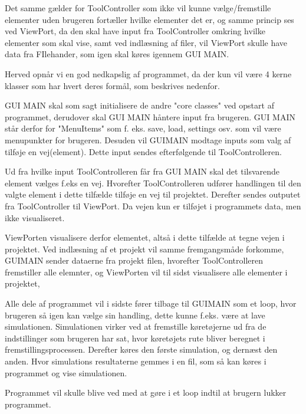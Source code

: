 Det samme gælder for ToolController som ikke vil kunne vælge/fremstille elementer uden brugeren fortæller hvilke elementer det er, og samme princip ses ved ViewPort, da den skal have input fra ToolController omkring hvilke elementer som skal vise, samt ved indlæsning af filer, vil ViewPort skulle have data fra FIlehander, som igen skal køres igennem GUI MAIN.

Herved opnår vi en god nedkapslig af programmet, da der kun vil være 4 kerne klasser som har hvert deres formål, som beskrives nedenfor.

\vspace{5mm}

GUI MAIN skal som sagt initialisere de andre "core classes" ved opstart af programmet, derudover skal GUI MAIN håntere input fra brugeren. GUI MAIN står derfor for "MenuItems" som f. eks. save, load, settings osv. som vil være menupunkter for brugeren. Desuden vil GUIMAIN modtage inputs som valg af tilføje en vej(element). Dette input sendes efterfølgende til ToolControlleren.

\vspace{5mm}

Ud fra hvilke input ToolControlleren får fra GUI MAIN skal det tilsvarende element vælges f.eks en vej. Hvorefter ToolControlleren udfører handlingen til den valgte element i dette tilfælde tilføje en vej til projektet. Derefter sendes outputet fra ToolController til ViewPort. Da vejen kun er tilføjet i programmets data, men ikke visualiseret. 

\vspace{5mm}

ViewPorten visualisere derfor elementet, altså i dette tilfælde at tegne vejen i projektet. Ved indlæsning af et projekt vil samme fremgangsmåde forkomme, GUIMAIN sender dataerne fra projekt filen, hvorefter ToolControlleren fremstiller alle elemnter, og ViewPorten vil til sidst visualisere alle elementer i projektet, 

Alle dele af programmet vil i sidste fører tilbage til GUIMAIN som et loop, hvor brugeren så igen kan vælge sin handling, dette kunne f.eks. være at lave simulationen. Simulationen virker ved at fremstille køretøjerne ud fra de indstillinger som brugeren har sat, hvor køretøjets rute bliver beregnet i fremstillingsprocessen. Derefter køres den første simulation, og dernæst den anden. Hvor simulations resultaterne gemmes i en fil, som så kan køres i programmet og vise simulationen.

Programmet vil skulle blive ved med at gøre i et loop indtil at brugern lukker programmet.


